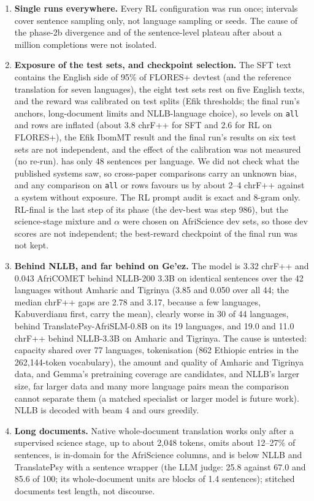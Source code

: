 \begin{enumerate}[label=\arabic*.]
\item \textbf{Single runs everywhere.} Every RL configuration was run once; intervals cover sentence sampling only, not language sampling or seeds. The cause of the phase-2b divergence and of the sentence-level plateau after about a million completions were not isolated.
\item \textbf{Exposure of the test sets, and checkpoint selection.} The SFT text contains the English side of 95\% of FLORES+ devtest (and the reference translation for seven languages), the eight test sets rest on five English texts, and the reward was calibrated on test splits (Efik thresholds; the final run's anchors, long-document limits and NLLB-language choice), so levels on \texttt{all} and \nopair{} rows are inflated (about 3.8 chrF++ for SFT and 2.6 for RL on FLORES+), the Efik IbomMT result and the final run's results on six test sets are not independent, and the effect of the calibration was not measured (no re-run). \clean{} has only 48 sentences per language. We did not check what the published systems saw, so cross-paper comparisons carry an unknown bias, and any comparison on \texttt{all} or \nopair{} rows favours us by about 2--4 chrF++ against a system without exposure. The RL prompt audit is exact and 8-gram only. RL-final is the last step of its phase (the dev-best was step 986), but the science-stage mixture and $\alpha$ were chosen on AfriScience dev sets, so those dev scores are not independent; the best-reward checkpoint of the final run was not kept.
\item \textbf{Behind NLLB, and far behind on Ge'ez.} The model is 3.32 chrF++ and 0.043 AfriCOMET behind NLLB-200 3.3B on identical sentences over the 42 languages without Amharic and Tigrinya (3.85 and 0.050 over all 44; the median chrF++ gaps are 2.78 and 3.17, because a few languages, Kabuverdianu first, carry the mean), clearly worse in 30 of 44 languages, behind TranslatePsy-AfriSLM-0.8B on its 19 languages, and 19.0 and 11.0 chrF++ behind NLLB-3.3B on Amharic and Tigrinya. The cause is untested: capacity shared over 77 languages, tokenisation (862 Ethiopic entries in the 262,144-token vocabulary), the amount and quality of Amharic and Tigrinya data, and Gemma's pretraining coverage are candidates, and NLLB's larger size, far larger data and many more language pairs mean the comparison cannot separate them (a matched specialist or larger model is future work). NLLB is decoded with beam 4 and ours greedily.
\item \textbf{Long documents.} Native whole-document translation works only after a supervised science stage, up to about 2,048 tokens, omits about 12--27\% of sentences, is in-domain for the AfriScience columns, and is below NLLB and TranslatePsy with a sentence wrapper (the LLM judge: 25.8 against 67.0 and 85.6 of 100; its whole-document units are blocks of 1.4 sentences); stitched documents test length, not discourse.

\end{enumerate}
